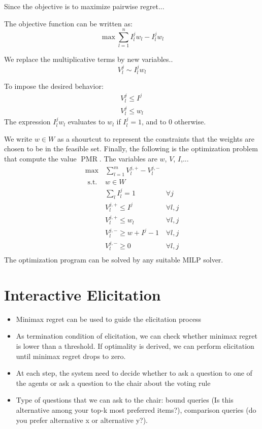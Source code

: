 \documentclass[12pt]{article}
\DeclareMathOperator{\PMR}{PMR}
\begin{document}
Since the objective is to maximize pairwise regret...
 
 The objective function can be written as:
 \[ \max \sum_{l=1}^n I^j_l w_l -  I^j_l w_l \]
 
 We replace the multiplicative terms by new variables..
\[ V_{l}^{j} \sim I^j_l w_l  \]

To impose the desired behavior:
\begin{align*} 
V_{l}^{j} \leq I^j \\
V_{l}^{j} \leq w_l
\end{align*}
The expression $I^j_l w_l$ evaluates to $w_l$ if $I^j_l = 1$, and to $0$ otherwise.
  
We write $w \in W$ as a shourtcut to represent the constraints that the weights are chosen to be in the feasible set.
 Finally, the following is the optimization problem that compute the value $\PMR$.
 The variables are $w$, $V$, $I$,...
\begin{align}
\max & \sum_{l=1}^m  V_{l}^{j,+} - V_{l}^{j,-}\\
\text{ s.t. } & w \in W  \\
& \sum_{l} I^{j}_{l} = 1 & \forall j \\
& V_{l}^{j,+} \leq I^j  & \forall l,j \\
& V_{l}^{j,+} \leq w_l & \forall l,j \\
& V_{l}^{j,-} \geq w + I^j - 1 & \forall l,j \\
& V_{l}^{j,-} \geq 0 & \forall l,j\\
\end{align} 
The optimization program can be solved by any suitable MILP solver.
 
\section{Interactive Elicitation} \label{sec:elicit}

\begin{itemize}
	\item Minimax regret can be used to guide the elicitation process
	\item As termination condition of elicitation, we can check whether minimax regret is lower than a threshold. If optimality is derived, we can perform elicitation until minimax regret drops to zero.
	\item At each step, the system need to decide whether to ask a question to one of the agents or ask a question to the chair about the voting rule
	\item Type of questions that we can ask to the chair:
	bound queries (Is this alternative among your top-k most preferred items?), comparison queries (do you prefer alternative x or alternative y?).
\end{itemize}
\end{document}
